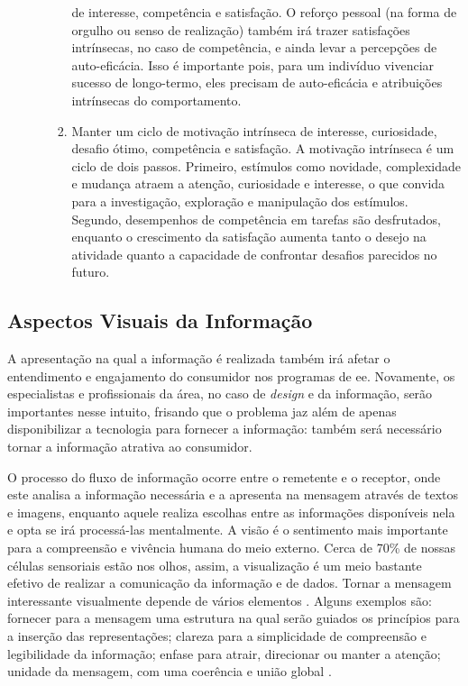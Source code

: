 \begin{itemize}
\begin{enumerate}
\begin{enumerate}
de interesse, competência e satisfação. O reforço pessoal (na forma de orgulho
ou senso de realização) também irá trazer satisfações intrínsecas, no caso de
competência, e ainda levar a percepções de auto-eficácia. Isso é
importante pois, para um indivíduo vivenciar sucesso de longo-termo, eles
precisam de auto-eficácia e atribuições intrínsecas do comportamento.
\item Manter um ciclo de motivação intrínseca de interesse, curiosidade, desafio
ótimo, competência e satisfação. A motivação intrínseca é um ciclo de dois
passos. Primeiro, estímulos como novidade, complexidade e mudança atraem a
atenção, curiosidade e interesse, o que convida para a investigação, exploração
e manipulação dos estímulos. Segundo, desempenhos de competência em tarefas são
desfrutados, enquanto o crescimento da satisfação aumenta tanto o desejo na
atividade quanto a capacidade de confrontar desafios parecidos no futuro. 
\end{enumerate}
\end{enumerate}
\end{itemize}

\subsection{Aspectos Visuais da Informação}
\label{ssec:asp_visuais}

A apresentação na qual a informação é realizada também irá afetar o entendimento
e engajamento do consumidor nos programas de \gls{ee}. Novamente, os especialistas
e profissionais da área, no caso de \emph{design} e da informação,
serão importantes nesse intuito, frisando que o problema jaz além de
apenas disponibilizar a tecnologia para fornecer a informação: também
será necessário tornar a informação atrativa ao consumidor.

O processo do fluxo de informação ocorre entre o remetente e o
receptor, onde este analisa a informação necessária e a apresenta na
mensagem através de textos e imagens, enquanto aquele realiza escolhas
entre as informações disponíveis nela e opta se irá processá-las
mentalmente. A visão é o sentimento mais importante para a compreensão
e vivência humana do meio externo.  Cerca de 70\% de nossas células
sensoriais estão nos olhos, assim, a visualização é um meio bastante
efetivo de realizar a comunicação da informação e de dados.  Tornar a
mensagem interessante visualmente depende de vários elementos
\cite{2012_visualisation_sweden}. Alguns exemplos são: fornecer para a
mensagem uma estrutura na qual serão guiados os princípios para a
inserção das representações; clareza para a simplicidade de
compreensão e legibilidade da informação; enfase para atrair,
direcionar ou manter a atenção; unidade da mensagem, com uma coerência
e união global \cite{it_depends}.

